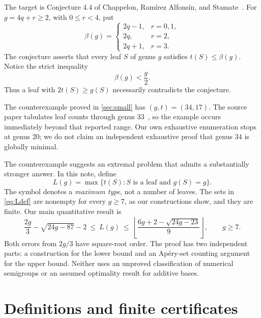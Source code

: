 \documentclass[11pt,letterpaper]{article}
\numberwithin{equation}{section}
\theoremstyle{definition}
\theoremstyle{remark}
\newcommand{\conjb}{\beta}
\begin{document}
The target is Conjecture 4.4 of Chappelon, Ram\'irez Alfons\'in, and
Stamate~\cite{CRS}. For $g=4q+r\ge2$, with $0\le r<4$, put
\begin{equation}\label{eq:oldbound}
 \conjb(g)=
 \begin{cases}
  2q-1,&r=0,1,\\
  2q,&r=2,\\
  2q+1,&r=3.
 \end{cases}
\end{equation}
The conjecture asserts that every leaf $S$ of genus $g$ satisfies
$t(S)\le\conjb(g)$. Notice the strict inequality
\begin{equation}\label{eq:beta-half}
 \conjb(g)<\frac g2.
\end{equation}
Thus a leaf with $2t(S)\ge g(S)$ necessarily contradicts the conjecture.

The counterexample proved in \cref{sec:small} has $(g,t)=(34,17)$.
The source paper tabulates leaf counts through genus $33$~\cite[Table 5]{CRS},
so the example occurs immediately beyond that reported range. Our own
exhaustive enumeration stops at genus $20$; we do not claim an independent
exhaustive proof that genus $34$ is globally minimal.

The counterexample suggests an extremal problem that admits a substantially
stronger answer. In this note, define
\begin{equation}\label{eq:Ldef}
 L(g)=\max\{t(S):S\text{ is a leaf and }g(S)=g\}.
\end{equation}
The symbol denotes a \emph{maximum type}, not a number of leaves. The sets in
\eqref{eq:Ldef} are nonempty for every $g\ge7$, as our constructions show, and
they are finite. Our main quantitative result is
\begin{equation}\label{eq:summarybounds}
 \frac{2g}{3}-\sqrt{24g-87}-2
 \ \le\ L(g)\ \le\
 \left\lfloor\frac{6g+2-\sqrt{24g-23}}{9}\right\rfloor,
 \qquad g\ge7.
\end{equation}
Both errors from $2g/3$ have square-root order. The proof has two independent
parts: a construction for the lower bound and an Ap\'ery-set counting argument
for the upper bound. Neither uses an unproved classification of numerical
semigroups or an assumed optimality result for additive bases.

\section{Definitions and finite certificates}\label{sec:definitions}
\end{document}
